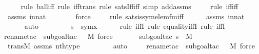 \begin{isabellebody}
\ \ \ \ \isamarkupfalse%
{\isacharparenleft}{\kern0pt}rule\ ball{\isacharunderscore}{\kern0pt}iff{\isacharcomma}{\kern0pt}\ rule\ iff{\isacharunderscore}{\kern0pt}trans{\isacharcomma}{\kern0pt}\ rule\ sats{\isacharunderscore}{\kern0pt}Iff{\isacharunderscore}{\kern0pt}iff{\isacharcomma}{\kern0pt}\ simp\ add{\isacharcolon}{\kern0pt}assms{\isacharparenright}{\kern0pt}\isanewline
\ \ \ \ \isamarkupfalse%
{\isacharparenleft}{\kern0pt}rule\ iff{\isacharunderscore}{\kern0pt}iff{\isacharparenright}{\kern0pt}\isanewline
\ \ \ \ \isamarkupfalse%
\ assms\ innat\ \isanewline
\ \ \ \ \ \isamarkupfalse%
\ force\isanewline
\ \ \ \ \isamarkupfalse%
{\isacharparenleft}{\kern0pt}rule\ sats{\isacharunderscore}{\kern0pt}is{\isacharunderscore}{\kern0pt}sym{\isacharunderscore}{\kern0pt}elem{\isacharunderscore}{\kern0pt}fm{\isacharunderscore}{\kern0pt}iff{\isacharparenright}{\kern0pt}\isanewline
\ \ \ \ \isamarkupfalse%
\ assms\ innat\ \isanewline
\ \ \ \ \isamarkupfalse%
\ auto\ \isanewline
\ \ \isamarkupfalse%
\ \isamarkupfalse%
\ {\isachardoublequoteopen}{\isachardot}{\kern0pt}{\isachardot}{\kern0pt}{\isachardot}{\kern0pt}\ {\isasymlongleftrightarrow}\ s\ {\isacharequal}{\kern0pt}\ sym{\isacharparenleft}{\kern0pt}x{\isacharparenright}{\kern0pt}{\isachardoublequoteclose}\ \isanewline
\ \ \ \ \isamarkupfalse%
{\isacharparenleft}{\kern0pt}rule\ iffI{\isacharcomma}{\kern0pt}\ rule\ equality{\isacharunderscore}{\kern0pt}iffI{\isacharcomma}{\kern0pt}\ rule\ iffI{\isacharparenright}{\kern0pt}\isanewline
\ \ \ \ \ \ \isamarkupfalse%
{\isacharparenleft}{\kern0pt}rename{\isacharunderscore}{\kern0pt}tac\ {\isasymtau}{\isacharcomma}{\kern0pt}\ subgoal{\isacharunderscore}{\kern0pt}tac\ {\isachardoublequoteopen}{\isasymtau}\ {\isasymin}\ M{\isachardoublequoteclose}{\isacharcomma}{\kern0pt}\ force{\isacharparenright}{\kern0pt}\isanewline
\ \ \ \ \ \ \isamarkupfalse%
{\isacharparenleft}{\kern0pt}subgoal{\isacharunderscore}{\kern0pt}tac\ {\isachardoublequoteopen}s\ {\isasymin}\ M{\isachardoublequoteclose}{\isacharparenright}{\kern0pt}\isanewline
\ \ \ \ \isamarkupfalse%
\ transM\ assms\ nth{\isacharunderscore}{\kern0pt}type\isanewline
\ \ \ \ \ \ \ \isamarkupfalse%
\ auto{\isacharbrackleft}{\kern0pt}{}{\isacharbrackright}{\kern0pt}\isanewline
\ \ \ \ \isamarkupfalse%
{\isacharparenleft}{\kern0pt}rename{\isacharunderscore}{\kern0pt}tac\ {\isasymtau}{\isacharcomma}{\kern0pt}\ subgoal{\isacharunderscore}{\kern0pt}tac\ {\isachardoublequoteopen}{\isasymtau}\ {\isasymin}\ M{\isachardoublequoteclose}{\isacharcomma}{\kern0pt}\ force{\isacharparenright}{\kern0pt}\isanewline

\end{isabellebody}
